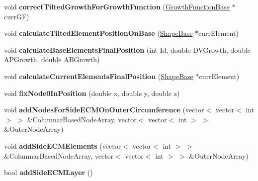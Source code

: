 \begin{DoxyCompactItemize}
\item 
\hypertarget{classSimulation_a3b25df63c54a058e6917309aed483e6e}{}void {\bfseries correct\+Tilted\+Growth\+For\+Growth\+Function} (\hyperlink{classGrowthFunctionBase}{Growth\+Function\+Base} $\ast$curr\+G\+F)\label{classSimulation_a3b25df63c54a058e6917309aed483e6e}

\item 
\hypertarget{classSimulation_acbe2603b1eb8b50978f9f1d30f87311c}{}void {\bfseries calculate\+Tilted\+Element\+Position\+On\+Base} (\hyperlink{classShapeBase}{Shape\+Base} $\ast$curr\+Element)\label{classSimulation_acbe2603b1eb8b50978f9f1d30f87311c}

\item 
\hypertarget{classSimulation_aa6e3525243aaf17afe95dc5bd97a124a}{}void {\bfseries calculate\+Base\+Elements\+Final\+Position} (int Id, double D\+V\+Growth, double A\+P\+Growth, double A\+B\+Growth)\label{classSimulation_aa6e3525243aaf17afe95dc5bd97a124a}

\item 
\hypertarget{classSimulation_af6f6e9ee39d12e91957d934a2f1711f9}{}void {\bfseries calculate\+Current\+Elements\+Final\+Position} (\hyperlink{classShapeBase}{Shape\+Base} $\ast$curr\+Element)\label{classSimulation_af6f6e9ee39d12e91957d934a2f1711f9}

\item 
\hypertarget{classSimulation_a4897adef943963c8f79f45fcc52e409a}{}void {\bfseries fix\+Node0\+In\+Position} (double x, double y, double z)\label{classSimulation_a4897adef943963c8f79f45fcc52e409a}

\item 
\hypertarget{classSimulation_af9abdc7b290e97ec38a19a25d91ea86b}{}void {\bfseries add\+Nodes\+For\+Side\+E\+C\+M\+On\+Outer\+Circumference} (vector$<$ vector$<$ int $>$ $>$ \&Columnar\+Based\+Node\+Array, vector$<$ vector$<$ int $>$ $>$ \&Outer\+Node\+Array)\label{classSimulation_af9abdc7b290e97ec38a19a25d91ea86b}

\item 
\hypertarget{classSimulation_a0378bdf235e19187ba64fbab4941e1da}{}void {\bfseries add\+Side\+E\+C\+M\+Elements} (vector$<$ vector$<$ int $>$ $>$ \&Columnar\+Based\+Node\+Array, vector$<$ vector$<$ int $>$ $>$ \&Outer\+Node\+Array)\label{classSimulation_a0378bdf235e19187ba64fbab4941e1da}

\item 
\hypertarget{classSimulation_a10f3ae44a7b51d9cab524870235c1f3e}{}bool {\bfseries add\+Side\+E\+C\+M\+Layer} ()\label{classSimulation_a10f3ae44a7b51d9cab524870235c1f3e}

\end{DoxyCompactItemize}
